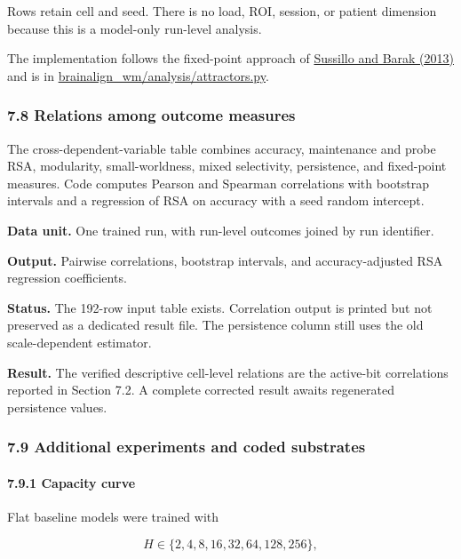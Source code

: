 \documentclass[
  10pt,
]{article}
\begin{document}
Rows retain cell and seed. There is no load, ROI, session, or patient
dimension because this is a model-only run-level analysis.

The implementation follows the fixed-point approach of
\href{https://doi.org/10.1162/NECO_a_00409}{Sussillo and Barak (2013)}
and is in \url{brainalign_wm/analysis/attractors.py}.

\hypertarget{relations-among-outcome-measures}{%
\subsubsection{7.8 Relations among outcome
measures}\label{relations-among-outcome-measures}}

The cross-dependent-variable table combines accuracy, maintenance and
probe RSA, modularity, small-worldness, mixed selectivity, persistence,
and fixed-point measures. Code computes Pearson and Spearman
correlations with bootstrap intervals and a regression of RSA on
accuracy with a seed random intercept.

\textbf{Data unit.} One trained run, with run-level outcomes joined by
run identifier.

\textbf{Output.} Pairwise correlations, bootstrap intervals, and
accuracy-adjusted RSA regression coefficients.

\textbf{Status.} The 192-row input table exists. Correlation output is
printed but not preserved as a dedicated result file. The persistence
column still uses the old scale-dependent estimator.

\textbf{Result.} The verified descriptive cell-level relations are the
active-bit correlations reported in Section 7.2. A complete corrected
result awaits regenerated persistence values.

\hypertarget{additional-experiments-and-coded-substrates}{%
\subsubsection{7.9 Additional experiments and coded
substrates}\label{additional-experiments-and-coded-substrates}}

\hypertarget{capacity-curve}{%
\paragraph{7.9.1 Capacity curve}\label{capacity-curve}}

Flat baseline models were trained with

\[
H\in\{2,4,8,16,32,64,128,256\},
\]
\end{document}
